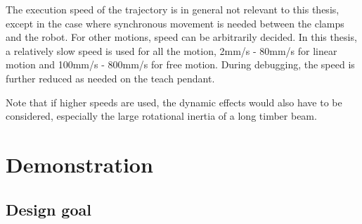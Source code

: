 The execution speed of the trajectory is in general not relevant to this thesis, except in the case where synchronous movement is needed between the clamps and the robot. For other motions, speed can be arbitrarily decided. In this thesis, a relatively slow speed is used for all the motion, 2mm/s - 80mm/s for linear motion and 100mm/s - 800mm/s for free motion. During debugging, the speed is further reduced as needed on the teach pendant. 

Note that if higher speeds are used, the dynamic effects would also have to be considered, especially the large rotational inertia of a long timber beam.

\section{Demonstration}
\label{section:exploration-2-demonstration}

\subsection{Design goal}
\label{subsection:exploration-2-design-goal}

